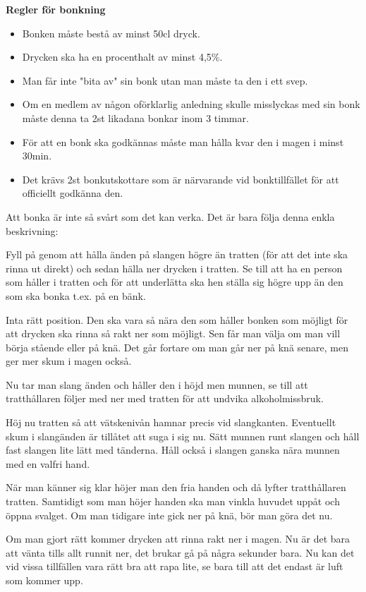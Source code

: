 \textbf{Regler för bonkning}

\begin{itemize}
    \item Bonken måste bestå av minst 50cl dryck.
    \item Drycken ska ha en procenthalt av minst 4,5\%.
    \item Man får inte "bita av" sin bonk utan man måste ta den i ett svep.
    \item Om en medlem av någon oförklarlig anledning skulle misslyckas med sin bonk måste denna ta 2st likadana bonkar inom 3 timmar.
    \item För att en bonk ska godkännas måste man hålla kvar den i magen i minst 30min.
    \item Det krävs 2st bonkutskottare som är närvarande vid bonktillfället för att officiellt godkänna den.
\end{itemize}\newpage


Att bonka är inte så svårt som det kan verka. Det är bara följa denna enkla beskrivning:

Fyll på genom att hålla änden på slangen högre än tratten (för att det inte ska rinna ut direkt) och sedan hälla ner drycken i tratten. Se till att ha en person som håller i tratten och för att underlätta ska hen ställa sig högre upp än den som ska bonka t.ex. på en bänk.

Inta rätt position. Den ska vara så nära den som håller bonken som möjligt för att drycken ska rinna så rakt ner som möjligt. Sen får man välja om man vill börja stående eller på knä. Det går fortare om man går ner på knä senare, men ger mer skum i magen också.

Nu tar man slang änden och håller den i höjd men munnen, se till att tratthållaren följer med ner med tratten för att undvika alkoholmissbruk.

Höj nu tratten så att vätskenivån hamnar precis vid slangkanten. Eventuellt skum i slangänden är tillåtet att suga i sig nu. Sätt munnen runt slangen och håll fast slangen lite lätt med tänderna. Håll också i slangen ganska nära munnen med en valfri hand.

När man känner sig klar höjer man den fria handen och då lyfter tratthållaren tratten. Samtidigt som man höjer handen ska man vinkla huvudet uppåt och öppna svalget. Om man tidigare inte gick ner på knä, bör man göra det nu.

Om man gjort rätt kommer drycken att rinna rakt ner i magen. Nu är det bara att vänta tills allt runnit ner, det brukar gå på några sekunder bara. Nu kan det vid vissa tillfällen vara rätt bra att rapa lite, se bara till att det endast är luft som kommer upp.

